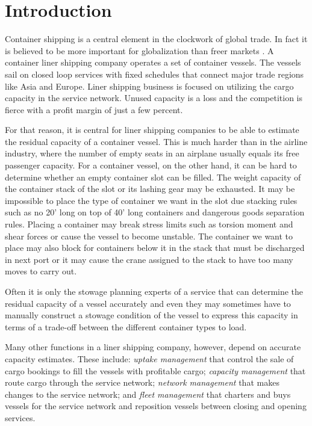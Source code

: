 %

%
\section{Introduction}

Container shipping is a central element in the clockwork of global trade. In fact it is believed to be more important for globalization than freer markets \cite{EC13}. A container liner shipping company operates a set of container vessels. The vessels sail on closed loop services with fixed  schedules that connect major trade regions like Asia and Europe. Liner shipping business is focused on utilizing the cargo capacity in the service network. Unused capacity is a loss and the competition is fierce with a profit margin of just a few percent.  

For that reason, it is central for liner shipping companies to be able to estimate the residual capacity of a container vessel. This is much harder than in the airline industry, where the number of empty seats in an airplane usually equals its free passenger capacity. For a container vessel, on the other hand, it can be hard to determine whether an empty container slot can be filled. The weight capacity of the container stack of the slot or its lashing gear may be exhausted. It may be impossible to place the type of container we want in the slot due stacking rules such as no 20' long on top of 40' long containers and dangerous goods separation rules. Placing a container may break stress limits such as torsion moment and shear forces or cause the vessel to become unstable. The container we want to place may also block for containers below it in the stack that must be discharged in next port or it may cause the crane assigned to the stack to have too many moves to carry out. 

Often it is only the stowage planning experts of a service that can determine the residual capacity of a vessel accurately and even they may sometimes have to manually construct a stowage condition of the vessel to express this capacity in terms of a trade-off between the different container types to load.

Many other functions in a liner shipping company, however, depend on accurate capacity estimates. These include: {\em uptake management} that control the sale of cargo bookings to fill the vessels with profitable cargo; {\em capacity management} that route cargo through the service network; {\em network management} that makes changes to the service network; and {\em fleet management} that charters and buys vessels for the service network and reposition vessels between closing and opening services.  

